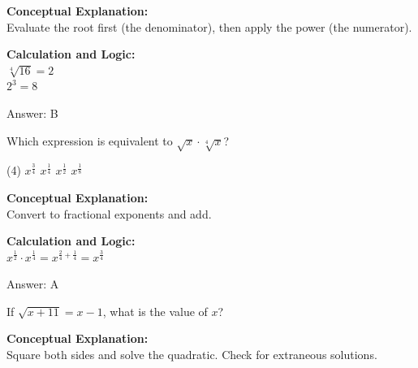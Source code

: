 \documentclass[11pt,paper=a4,answers]{exam}
\begin{document}
\begin{questions}
\begin{solution}
\textbf{Conceptual Explanation:} \\
Evaluate the root first (the denominator), then apply the power (the numerator).

\vspace{20pt}

\textbf{Calculation and Logic:} \\
$\sqrt[4]{16} = 2$ \\
$2^3 = 8$

\vspace{25pt}

Answer: \colorbox{yellow!100}{B}
\end{solution}

\vspace{40pt}

\question
Which expression is equivalent to $\sqrt{x} \cdot \sqrt[4]{x}$?
\begin{tasks}(4)
    \task $x^{\frac{3}{4}}$
    \task $x^{\frac{1}{4}}$
    \task $x^{\frac{1}{2}}$
    \task $x^{\frac{1}{8}}$
\end{tasks}

\begin{solution}
\textbf{Conceptual Explanation:} \\
Convert to fractional exponents and add.

\vspace{20pt}

\textbf{Calculation and Logic:} \\
$x^{\frac{1}{2}} \cdot x^{\frac{1}{4}} = x^{\frac{2}{4} + \frac{1}{4}} = x^{\frac{3}{4}}$

\vspace{25pt}

Answer: \colorbox{yellow!100}{A}
\end{solution}

\vspace{40pt}

\question
If $\sqrt{x+11} = x-1$, what is the value of $x$?

\begin{solution}
\textbf{Conceptual Explanation:} \\
Square both sides and solve the quadratic. Check for extraneous solutions.

\vspace{20pt}


\end{solution}
\end{questions}
\end{document}
